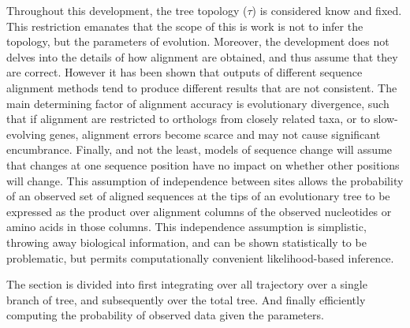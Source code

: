 Throughout this development, the tree topology ($\tau$) is considered know and fixed.
This restriction emanates that the scope of this is work is not to infer the topology, but the parameters of evolution.
Moreover, the development does not delves into the details of how alignment are obtained, and thus assume that they are correct.
However it has been shown that outputs of different sequence alignment methods tend to produce different results that are not consistent.
The main determining factor of alignment accuracy is evolutionary divergence, such that if alignment are restricted to orthologs from closely related taxa, or to slow-evolving genes, alignment errors become scarce and may not cause significant encumbrance.
Finally, and not the least, models of sequence change will assume that changes at one sequence position have no impact on whether other positions will change.
This assumption of independence between sites allows the probability of an observed set of aligned sequences at the tips of an evolutionary tree to be expressed as the product over alignment columns of the observed nucleotides or amino acids in those columns. 
This independence assumption is simplistic, throwing away biological information, and can be shown statistically to be problematic, but permits computationally convenient likelihood-based inference.

The section is divided into first integrating over all trajectory over a single branch of tree, and subsequently over the total tree. And finally efficiently computing the probability of observed data given the parameters.

